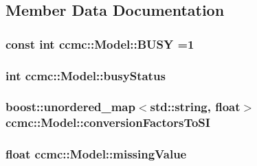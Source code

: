 \subsection{Member Data Documentation}
\hypertarget{classccmc_1_1_model_a2455ad851ac80f63d5d0af2c6c77cfcc}{
\subsubsection[{B\-U\-S\-Y}]{\setlength{\rightskip}{0pt plus 5cm}const int ccmc\-::\-Model\-::\-B\-U\-S\-Y =1\hspace{0.3cm}{\ttfamily [static]}}}\label{classccmc_1_1_model_a2455ad851ac80f63d5d0af2c6c77cfcc}
\hypertarget{classccmc_1_1_model_acee07d9abc8cb8c0bc3fbaeb879cc251}{
\subsubsection[{busy\-Status}]{\setlength{\rightskip}{0pt plus 5cm}int ccmc\-::\-Model\-::busy\-Status\hspace{0.3cm}{\ttfamily [protected]}}}\label{classccmc_1_1_model_acee07d9abc8cb8c0bc3fbaeb879cc251}
\hypertarget{classccmc_1_1_model_ab62ff417dd01ef7137490747cb0b3641}{
\subsubsection[{conversion\-Factors\-To\-S\-I}]{\setlength{\rightskip}{0pt plus 5cm}boost\-::unordered\-\_\-map$<$std\-::string, float$>$ ccmc\-::\-Model\-::conversion\-Factors\-To\-S\-I\hspace{0.3cm}{\ttfamily [protected]}}}\label{classccmc_1_1_model_ab62ff417dd01ef7137490747cb0b3641}
\hypertarget{classccmc_1_1_model_ae18cabca92352739be2b97f0ee973475}{
\subsubsection[{missing\-Value}]{\setlength{\rightskip}{0pt plus 5cm}float ccmc\-::\-Model\-::missing\-Value\hspace{0.3cm}{\ttfamily [protected]}}}\label{classccmc_1_1_model_ae18cabca92352739be2b97f0ee973475}
